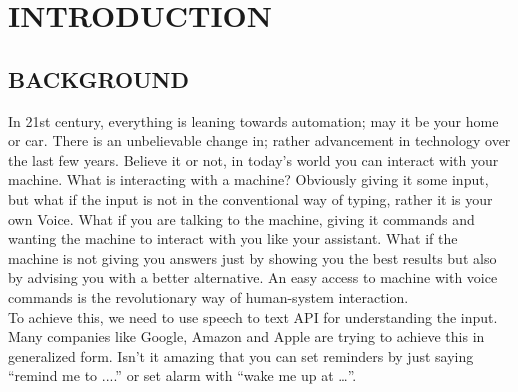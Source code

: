 \documentclass[12pt]{extreport}
\begin{document}
\begin{titlepage}

\end{titlepage}

\setcounter{page}{2}






\newpage
\pagestyle{fancy}
\setcounter{page}{4}
\fancyhf{}
\fancyhead[LE,RO]{\textit{\leftmark}}
\fancyhead[RE,LO]{}
\fancyfoot[LE,RO]{\thepage}
 
\renewcommand{\headrulewidth}{2pt}
\renewcommand{\footrulewidth}{1pt}
\newpage

\listoffigures
\newpage
\listoftables
\newpage
\tableofcontents

\chapter{INTRODUCTION}
\setcounter{page}{1}
\section{BACKGROUND}
\hspace*{3em}In 21st century, everything is leaning towards automation; may it be your home or car. There is an unbelievable change in; rather advancement in technology over the last few years. Believe it or not, in today's world you can interact with your machine. What is interacting with a machine? Obviously giving it some input, but what if the input is not in the conventional way of typing, rather it is your own Voice. What if you are talking to the machine, giving it commands and wanting the machine to interact with you like your assistant. What if the machine is not giving you answers just by showing you the best results but also by advising you with a better alternative. An easy access to machine with voice commands is the revolutionary way of human-system interaction.\\

\noindent
To achieve this, we need to use speech to text API for understanding the input. Many companies like Google, Amazon and Apple are trying to achieve this in generalized form. Isn’t it amazing that you can set reminders by just saying “remind me to ....” or set alarm with “wake me up at …”.\\
\end{document}

